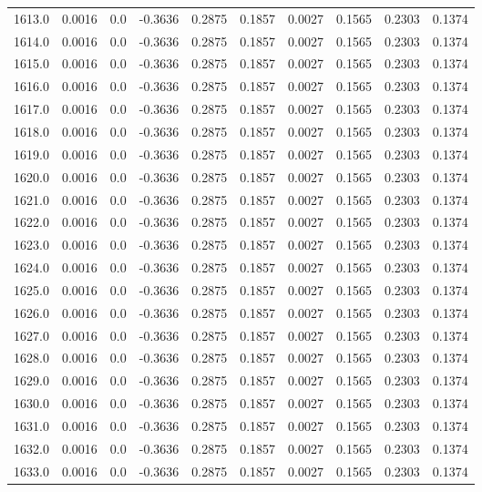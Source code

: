 \begin{longtable}{lrrrrrrrrr}
1613.0 & 0.0016 & 0.0 & -0.3636 & 0.2875 & 0.1857 & 0.0027 & 0.1565 & 0.2303 & 0.1374 \\
1614.0 & 0.0016 & 0.0 & -0.3636 & 0.2875 & 0.1857 & 0.0027 & 0.1565 & 0.2303 & 0.1374 \\
1615.0 & 0.0016 & 0.0 & -0.3636 & 0.2875 & 0.1857 & 0.0027 & 0.1565 & 0.2303 & 0.1374 \\
1616.0 & 0.0016 & 0.0 & -0.3636 & 0.2875 & 0.1857 & 0.0027 & 0.1565 & 0.2303 & 0.1374 \\
1617.0 & 0.0016 & 0.0 & -0.3636 & 0.2875 & 0.1857 & 0.0027 & 0.1565 & 0.2303 & 0.1374 \\
1618.0 & 0.0016 & 0.0 & -0.3636 & 0.2875 & 0.1857 & 0.0027 & 0.1565 & 0.2303 & 0.1374 \\
1619.0 & 0.0016 & 0.0 & -0.3636 & 0.2875 & 0.1857 & 0.0027 & 0.1565 & 0.2303 & 0.1374 \\
1620.0 & 0.0016 & 0.0 & -0.3636 & 0.2875 & 0.1857 & 0.0027 & 0.1565 & 0.2303 & 0.1374 \\
1621.0 & 0.0016 & 0.0 & -0.3636 & 0.2875 & 0.1857 & 0.0027 & 0.1565 & 0.2303 & 0.1374 \\
1622.0 & 0.0016 & 0.0 & -0.3636 & 0.2875 & 0.1857 & 0.0027 & 0.1565 & 0.2303 & 0.1374 \\
1623.0 & 0.0016 & 0.0 & -0.3636 & 0.2875 & 0.1857 & 0.0027 & 0.1565 & 0.2303 & 0.1374 \\
1624.0 & 0.0016 & 0.0 & -0.3636 & 0.2875 & 0.1857 & 0.0027 & 0.1565 & 0.2303 & 0.1374 \\
1625.0 & 0.0016 & 0.0 & -0.3636 & 0.2875 & 0.1857 & 0.0027 & 0.1565 & 0.2303 & 0.1374 \\
1626.0 & 0.0016 & 0.0 & -0.3636 & 0.2875 & 0.1857 & 0.0027 & 0.1565 & 0.2303 & 0.1374 \\
1627.0 & 0.0016 & 0.0 & -0.3636 & 0.2875 & 0.1857 & 0.0027 & 0.1565 & 0.2303 & 0.1374 \\
1628.0 & 0.0016 & 0.0 & -0.3636 & 0.2875 & 0.1857 & 0.0027 & 0.1565 & 0.2303 & 0.1374 \\
1629.0 & 0.0016 & 0.0 & -0.3636 & 0.2875 & 0.1857 & 0.0027 & 0.1565 & 0.2303 & 0.1374 \\
1630.0 & 0.0016 & 0.0 & -0.3636 & 0.2875 & 0.1857 & 0.0027 & 0.1565 & 0.2303 & 0.1374 \\
1631.0 & 0.0016 & 0.0 & -0.3636 & 0.2875 & 0.1857 & 0.0027 & 0.1565 & 0.2303 & 0.1374 \\
1632.0 & 0.0016 & 0.0 & -0.3636 & 0.2875 & 0.1857 & 0.0027 & 0.1565 & 0.2303 & 0.1374 \\
1633.0 & 0.0016 & 0.0 & -0.3636 & 0.2875 & 0.1857 & 0.0027 & 0.1565 & 0.2303 & 0.1374 \\

\end{longtable}

